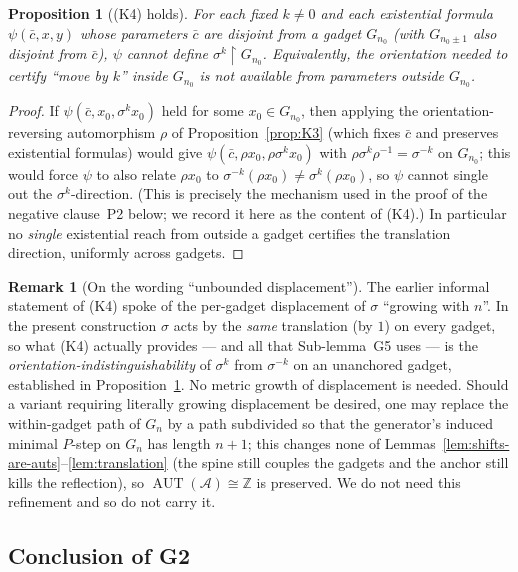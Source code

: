 \documentclass[12pt,fullpage]{article}
\newtheorem{proposition}[theorem]{Proposition}
\theoremstyle{definition}
\newtheorem{remark}[theorem]{Remark}
\newcommand{\A}{\mathcal{A}}
\newcommand{\Z}{{\mathbb{Z}}}
\newcommand{\AUT}{\operatorname{AUT}}
\begin{document}
\begin{proposition}[(K4) holds]\label{prop:K4}
For each fixed $k\ne 0$ and each existential formula $\psi(\bar c,x,y)$ whose
parameters $\bar c$ are disjoint from a gadget $G_{n_0}$ (with $G_{n_0\pm1}$
also disjoint from $\bar c$), $\psi$ cannot define $\sigma^k\restriction
G_{n_0}$.  Equivalently, the orientation needed to certify ``move by $k$''
inside $G_{n_0}$ is not available from parameters outside $G_{n_0}$.
\end{proposition}

\begin{proof}
If $\psi(\bar c,x_0,\sigma^k x_0)$ held for some $x_0\in G_{n_0}$, then
applying the orientation-reversing automorphism $\rho$ of
Proposition~\ref{prop:K3} (which fixes $\bar c$ and preserves existential
formulas) would give $\psi(\bar c,\rho x_0,\rho\sigma^k x_0)$ with
$\rho\sigma^k\rho^{-1}=\sigma^{-k}$ on $G_{n_0}$; this would force $\psi$ to
also relate $\rho x_0$ to $\sigma^{-k}(\rho x_0)\ne\sigma^{k}(\rho x_0)$,
so $\psi$ cannot single out the $\sigma^k$-direction.  (This is precisely the
mechanism used in the proof of the negative clause~P2 below; we record it here
as the content of (K4).)  In particular no \emph{single} existential reach
from outside a gadget certifies the translation direction, uniformly across
gadgets.
\end{proof}

\begin{remark}[On the wording ``unbounded displacement'']\label{rem:K4-honest}
The earlier informal statement of (K4) spoke of the per-gadget displacement of
$\sigma$ ``growing with $n$''.  In the present construction $\sigma$ acts by
the \emph{same} translation (by $1$) on every gadget, so what (K4) actually
provides --- and all that Sub-lemma~G5 uses --- is the
\emph{orientation-indistinguishability} of $\sigma^k$ from $\sigma^{-k}$ on an
unanchored gadget, established in Proposition~\ref{prop:K4}.  No metric growth
of displacement is needed.  Should a variant requiring literally growing
displacement be desired, one may replace the within-gadget path of $G_n$ by a
path subdivided so that the generator's induced minimal $P$-step on $G_n$ has
length $n+1$; this changes none of Lemmas~\ref{lem:shifts-are-auts}--\ref{lem:translation}
(the spine still couples the gadgets and the anchor still kills the reflection),
so $\AUT(\A)\cong\Z$ is preserved.  We do not need this refinement and so do
not carry it.
\end{remark}

\subsection*{Conclusion of G2}
\end{document}
